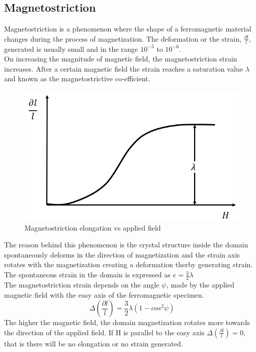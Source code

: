 \documentclass[12pt,a4paper,bold]{thesis}
\theoremstyle{thm}
\theoremstyle{definition}
\begin{document}
\subsection{Magnetostriction}
Magnetostriction is a phenomenon where the shape of a ferromagnetic material changes during the process of magnetization. The deformation or the strain, $ \frac{\partial l}{l}$, generated is usually small and in the range $10^{-5}$ to $10^{-6}$.\\
On increasing the magnitude of magnetic field, the magnetostriction strain increases. After a certain magnetic field the strain reaches a saturation value $\lambda$ and known as the magnetostrictive co-efficient.
\begin{figure}[H]
	\centering
   \includegraphics[scale=0.56]{Images/24.png} 
   \caption{Magnetostriction elongation vs applied field}
\end{figure}
The reason behind this phenomenon is the crystal structure inside the domain spontaneously deforms in the direction of magnetization and the strain axis rotates with the magnetization creating a deformation therby generating strain.\\
The spontaneous strain in the domain is expressed as $e=\frac{3}{2} \lambda$\\
The magnetostriction strain depends on the angle $\psi$, made by the applied magnetic field with the easy axis of the ferromagnetic specimen.
\[\Delta(\frac{\partial l}{l})=\frac{3}{2}\lambda(1-cos^2\psi)\]
The higher the magnetic field, the domain magnetization rotates more towards the direction of the applied field. If H is parallel to the easy axis $\Delta(\frac{\partial l}{l})=0$, that is there will be no elongation or no strain generated.
\end{document}
